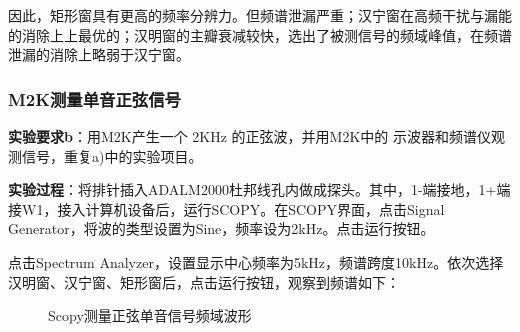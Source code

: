 \documentclass[12pt]{article}
\begin{document}
因此，矩形窗具有更高的频率分辨力。但频谱泄漏严重；汉宁窗在高频干扰与漏能的消除上上最优的；汉明窗的主瓣衰减较快，选出了被测信号的频域峰值，在频谱泄漏的消除上略弱于汉宁窗。



\subsubsection{M2K测量单音正弦信号}


\textbf{实验要求b}：用M2K产生一个 2KHz 的正弦波，并用M2K中的
示波器和频谱仪观测信号，重复a)中的实验项目。

\textbf{实验过程}：将排针插入ADALM2000杜邦线孔内做成探头。其中，1-端接地，1+端接W1，接入计算机设备后，运行SCOPY。在SCOPY界面，点击Signal Generator，将波的类型设置为Sine，频率设为2kHz。点击运行按钮。

点击Spectrum Analyzer，设置显示中心频率为5kHz，频谱跨度10kHz。依次选择汉明窗、汉宁窗、矩形窗后，点击运行按钮，观察到频谱如下：
\begin{figure}[H]
    \centering
    
     \hspace{0.005\linewidth}
         \hspace{0.005\linewidth}
    \caption{Scopy测量正弦单音信号频域波形}
  \label{Scopy_sine}
\end{figure}
\end{document}

